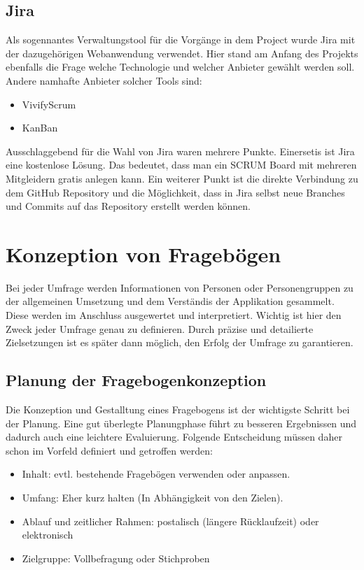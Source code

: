 \subsection{Jira}
Als sogennantes Verwaltungstool für die Vorgänge in dem Project wurde Jira mit der dazugehörigen
Webanwendung verwendet. Hier stand am Anfang des Projekts ebenfalls die Frage welche Technologie
und welcher Anbieter gewählt werden soll. Andere namhafte Anbieter solcher Tools sind:
\begin{itemize}
    \item VivifyScrum
    \item KanBan
\end{itemize}
Ausschlaggebend für die Wahl von Jira waren mehrere Punkte. Einersetis ist Jira eine kostenlose
Lösung. Das bedeutet, dass man ein SCRUM Board mit mehreren Mitgleidern gratis anlegen kann.
Ein weiterer Punkt ist die direkte Verbindung zu dem GitHub Repository und die Möglichkeit,
dass in Jira selbst neue Branches und Commits auf das Repository erstellt werden können.

\section{Konzeption von Fragebögen}
Bei jeder Umfrage werden Informationen von Personen oder Personengruppen zu der allgemeinen
Umsetzung und dem Verständis der Applikation gesammelt. Diese werden im Anschluss ausgewertet und
interpretiert. Wichtig ist hier den Zweck jeder Umfrage genau zu definieren. Durch präzise und
detailierte Zielsetzungen ist es später dann möglich, den Erfolg der Umfrage zu garantieren.

\subsection{Planung der Fragebogenkonzeption}
Die Konzeption und Gestalltung eines Fragebogens ist der wichtigste Schritt bei der Planung.
Eine gut überlegte Planungphase führt zu besseren Ergebnissen und dadurch auch eine leichtere
Evaluierung. Folgende Entscheidung müssen daher schon im Vorfeld definiert und getroffen werden:
\begin{itemize}
    \item Inhalt: evtl. bestehende Fragebögen verwenden oder anpassen.
    \item Umfang: Eher kurz halten (In Abhängigkeit von den Zielen).
    \item Ablauf und zeitlicher Rahmen: postalisch (längere Rücklaufzeit) oder elektronisch
    \item Zielgruppe: Vollbefragung oder Stichproben
\end{itemize}

